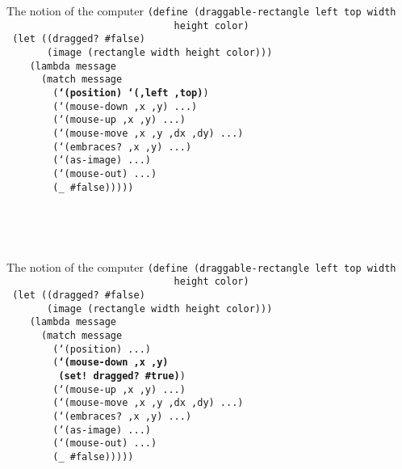 \begin{frame}{The notion of the computer}
  \small
  \texttt{(define (draggable-rectangle left top width \\
    \ \ \ \ \ \ \ \ \ \ \ \ \ \ \ \ \ \ \ \ \ \ \ \ \ \ \ \ \ height color)\\
    \ (let ((dragged? \#false)\\
  \ \ \ \ \ \ \ (image (rectangle width height color)))\\
  \ \ \ \ (lambda message\\
  \ \ \ \ \ \ (match message\\
  \ \ \ \ \ \ \ \ (\textbf{`(position) `(,left ,top)})\\
  \ \ \ \ \ \ \ \ (`(mouse-down ,x ,y) ...)\\
  \ \ \ \ \ \ \ \ (`(mouse-up ,x ,y) ...)\\
  \ \ \ \ \ \ \ \ (`(mouse-move ,x ,y ,dx ,dy) ...)\\
  \ \ \ \ \ \ \ \ (`(embraces? ,x ,y) ...)\\
  \ \ \ \ \ \ \ \ (`(as-image) ...)\\
  \ \ \ \ \ \ \ \ (`(mouse-out) ...)\\
  \ \ \ \ \ \ \ \ (\_ \#false)))))\\
  \ \\
  \ \\
  \ \\
  \ 
}
\end{frame}

\begin{frame}{The notion of the computer}
  \small
  \texttt{(define (draggable-rectangle left top width \\
    \ \ \ \ \ \ \ \ \ \ \ \ \ \ \ \ \ \ \ \ \ \ \ \ \ \ \ \ \ height color)\\
    \ (let ((dragged? \#false)\\
  \ \ \ \ \ \ \ (image (rectangle width height color)))\\
  \ \ \ \ (lambda message\\
  \ \ \ \ \ \ (match message\\
  \ \ \ \ \ \ \ \ (`(position) ...)\\
  \ \ \ \ \ \ \ \ (\textbf{`(mouse-down ,x ,y)\\
    \ \ \ \ \ \ \ \ \ (set! dragged? \#true)})\\
  \ \ \ \ \ \ \ \ (`(mouse-up ,x ,y) ...)\\
  \ \ \ \ \ \ \ \ (`(mouse-move ,x ,y ,dx ,dy) ...)\\
  \ \ \ \ \ \ \ \ (`(embraces? ,x ,y) ...)\\
  \ \ \ \ \ \ \ \ (`(as-image) ...)\\
  \ \ \ \ \ \ \ \ (`(mouse-out) ...)\\
  \ \ \ \ \ \ \ \ (\_ \#false)))))\\
  \ \\
  \ \\
  \ 
}
\end{frame}

